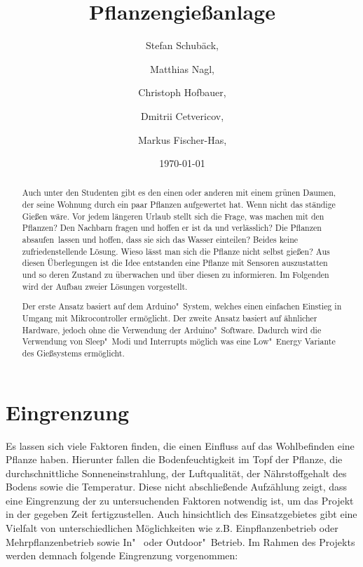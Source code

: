 \documentclass[]{IEEEtran}
\title{Pflanzengießanlage}
\date{\today}
\author{ Stefan Schubäck, \and Matthias Nagl,\and Christoph Hofbauer, \and Dmitrii Cetvericov, \and Markus Fischer-Has,}
\begin{document}
	\maketitle

\begin{abstract}
Auch unter den Studenten gibt es den einen oder anderen mit einem grünen Daumen, der seine Wohnung durch ein paar Pflanzen aufgewertet hat. 
Wenn nicht das ständige Gießen wäre. 
Vor jedem längeren Urlaub stellt sich die Frage, was machen mit den Pflanzen? 
Den Nachbarn fragen und hoffen er ist da und verlässlich? 
Die Pflanzen \glqq absaufen\grqq \ lassen und hoffen, dass sie sich das Wasser einteilen? 
Beides keine zufriedenstellende Lösung. Wieso lässt man sich die Pflanze nicht selbst gießen?
Aus diesen Überlegungen ist die Idee entstanden eine Pflanze mit Sensoren auszustatten und so deren Zustand zu überwachen und über diesen zu informieren.
Im Folgenden wird der Aufbau zweier Lösungen vorgestellt. 

Der erste Ansatz basiert auf dem Arduino"~System, welches einen einfachen Einstieg in Umgang mit Mikrocontroller ermöglicht. 
Der zweite Ansatz basiert auf ähnlicher Hardware, jedoch ohne die Verwendung der Arduino"~Software. 
Dadurch wird die Verwendung von Sleep"~Modi und Interrupts möglich was eine Low"~Energy Variante des Gießsystems ermöglicht.  

\end{abstract}

\section{Eingrenzung}
Es lassen sich viele Faktoren finden, die einen Einfluss auf das Wohlbefinden eine Pflanze haben. 
Hierunter fallen die Bodenfeuchtigkeit im Topf der Pflanze, die durchschnittliche Sonneneinstrahlung, der Luftqualität, der Nährstoffgehalt des Bodens sowie die Temperatur. 
Diese nicht abschließende Aufzählung zeigt, dass eine Eingrenzung der zu untersuchenden Faktoren notwendig ist, um das Projekt in der gegeben Zeit fertigzustellen.
Auch hinsichtlich des Einsatzgebietes gibt eine Vielfalt von unterschiedlichen Möglichkeiten wie z.B. Einpflanzenbetrieb oder Mehrpflanzenbetrieb sowie In"~ oder Outdoor"~Betrieb. 
Im Rahmen des Projekts werden demnach folgende Eingrenzung vorgenommen:
\end{document}
